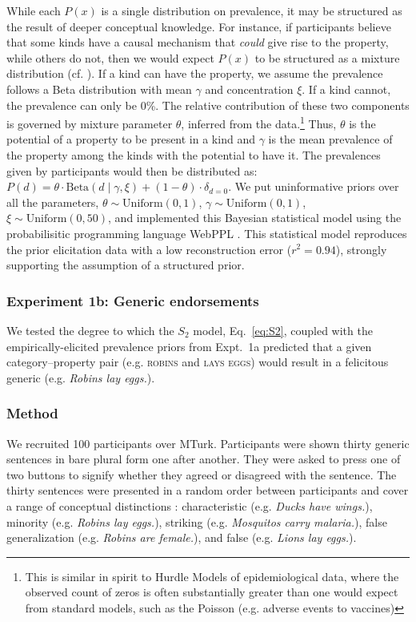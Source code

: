 \documentclass[11pt,letterpaper]{article}
\begin{document}
While each $P(x)$ is a single distribution on prevalence, it may be structured as the result of deeper conceptual knowledge. 
For instance, if participants believe that some kinds have a causal mechanism that \emph{could} give rise to the property, while others do not, then we would expect $P(x)$ to be structured as a mixture distribution (cf. ).
If a kind can have the property, we assume the prevalence follows a Beta distribution with mean $\gamma$ and concentration $\xi$. 
If a kind cannot, the prevalence can only be 0\%.
The relative contribution of these two components is governed by mixture parameter $\theta$, inferred from the data.\footnote{This is similar in spirit to Hurdle Models of epidemiological data, where the observed count of zeros is often substantially greater than one would expect from standard models, such as the Poisson (e.g. adverse events to vaccines)\cite{hurdleModels}}
Thus, $\theta$ is the potential of a property to be present in a kind and $\gamma$ is the mean prevalence of the property among the kinds with the potential to have it. The prevalences given by participants would then be distributed as: $P(d) = \theta \cdot \text{Beta}(d \mid \gamma,\xi)+ (1 - \theta) \cdot \delta_{d=0} $. 
We put uninformative priors over all the parameters, $\theta \sim \text{Uniform}(0,1)$, 
$\gamma \sim \text{Uniform}(0,1)$, $\xi \sim \text{Uniform}(0, 50)$, and implemented this Bayesian statistical model using the probabilisitic programming language WebPPL \cite{dippl}. This statistical model reproduces the prior elicitation data with a low reconstruction error ($r^2 = 0.94$), strongly supporting the assumption of a structured prior. 

\subsubsection*{Experiment 1b: Generic endorsements}

 
We tested the degree to which the $S_2$ model, Eq.~\ref{eq:S2}, coupled with the empirically-elicited prevalence priors from Expt.~1a predicted that a given category--property pair (e.g. \textsc{robins} and \textsc{lays eggs}) would result in a felicitous generic (e.g. \emph{Robins lay eggs.}). 


\subsubsection*{Method}

We recruited 100 participants over MTurk. 
Participants were shown thirty generic sentences in bare plural form one after another. 
They were asked to press one of two buttons to signify whether they agreed or disagreed with the sentence. 
The thirty sentences were presented in a random order between participants and cover a range of conceptual distinctions  \cite{Prasada2013}: characteristic (e.g. \emph{Ducks have wings.}), minority (e.g. \emph{Robins lay eggs.}), striking (e.g. \emph{Mosquitos carry malaria.}), false generalization (e.g. \emph{Robins are female.}), and false (e.g. \emph{Lions lay eggs.}).
\end{document}

